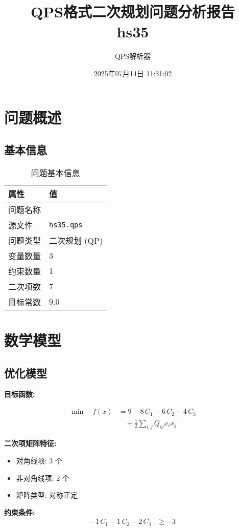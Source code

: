 \documentclass[a4paper,11pt]{article}
\title{QPS格式二次规划问题分析报告\\{\large hs35}}
\author{QPS解析器}
\date{2025年07月14日 11:31:02}
\begin{document}
\maketitle
\tableofcontents
\newpage

\section{问题概述}
\subsection{基本信息}
\begin{table}[h!]
\centering
\begin{tabular}{ll}
\toprule
\textbf{属性} & \textbf{值} \\
\midrule
问题名称 & \texttt{} \\
源文件 & \texttt{hs35.qps} \\
问题类型 & 二次规划 (QP) \\
变量数量 & 3 \\
约束数量 & 1 \\
二次项数 & 7 \\
目标常数 & 9.0 \\
\bottomrule
\end{tabular}
\caption{问题基本信息}
\end{table}

\section{数学模型}
\subsection{优化模型}

\textbf{目标函数:}

\begin{align}
\min\quad f(x) &= 9 - 8\,C_{1} - 6\,C_{2} - 4\,C_{3} \nonumber\\
&\quad + \frac{1}{2} \sum_{i,j} Q_{ij} x_i x_j\label{eq:objective}
\end{align}

\textbf{二次项矩阵特征:}
\begin{itemize}
\item 对角线项: 3 个
\item 非对角线项: 2 个
\item 矩阵类型: 对称正定
\end{itemize}

\textbf{约束条件:}
\begin{align}
-1\,C_{1} - 1\,C_{2} - 2\,C_{3} &\geq -3 \nonumber
\end{align}
\end{document}
